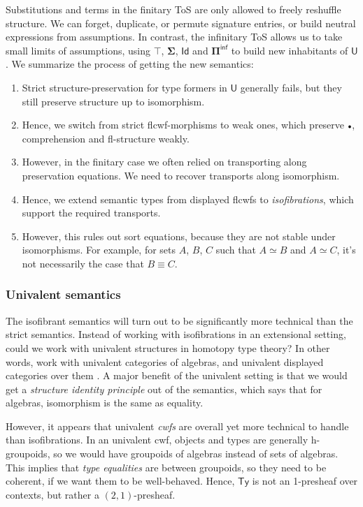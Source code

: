 \documentclass[12pt,a4paper,twoside,openany]{book}
\theoremstyle{remark}
\theoremstyle{definition}
\theoremstyle{theorem}
\newcommand{\bs}[1]{\boldsymbol{#1}}
\newcommand{\Ty}{\mathsf{Ty}}
\newcommand{\U}{\mathsf{U}}
\newcommand{\Id}{\mathsf{Id}}
\newcommand{\emptycon}{\scaleobj{.75}\bullet}
\newcommand{\Piinf}{\Pi^{\mathsf{inf}}}
\newcommand{\bU}{\bs{\U}}
\begin{document}
Substitutions and terms in the finitary ToS are only allowed to freely reshuffle
structure. We can forget, duplicate, or permute signature entries, or build
neutral expressions from assumptions. In contrast, the infinitary ToS allows us
to take small limits of assumptions, using $\bs{\top}$, $\bs{\Sigma}$, $\bs{\Id}$ and $\bs{\Piinf}$
to build new inhabitants of $\bU$. We summarize the process of getting the new
semantics:
\begin{enumerate}
\item Strict structure-preservation for type formers in $\bU$ generally fails, but they still
      preserve structure up to isomorphism.
\item Hence, we switch from strict flcwf-morphisms to weak ones, which preserve $\emptycon$, comprehension
      and fl-structure weakly.
\item However, in the finitary case we often relied on transporting along
      preservation equations. We need to recover transports along isomorphism.
\item Hence, we extend semantic types from displayed flcwfs to \emph{isofibrations}, which
      support the required transports.
\item However, this rules out sort equations, because they are not stable under
      isomorphisms. For example, for sets $A$, $B$, $C$ such that $A \simeq B$ and
      $A \simeq C$, it's not necessarily the case that $B \equiv C$.
\end{enumerate}

\subsubsection{Univalent semantics}

The isofibrant semantics will turn out to be significantly more technical than
the strict semantics. Instead of working with isofibrations in an extensional
setting, could we work with univalent structures in homotopy type theory? In
other words, work with univalent categories of algebras, and univalent displayed
categories over them \cite{displayedcats}. A major benefit of the univalent
setting is that we would get a \emph{structure identity principle} \cite{TODO}
out of the semantics, which says that for algebras, isomorphism is the same as
equality.

However, it appears that univalent \emph{cwfs} are overall yet more technical to
handle than isofibrations. In an univalent cwf, objects and types are generally
h-groupoids, so we would have groupoids of algebras instead of sets of
algebras. This implies that \emph{type equalities} are between groupoids, so
they need to be coherent, if we want them to be well-behaved. Hence, $\Ty$ is
not an 1-presheaf over contexts, but rather a $(2,1)$-presheaf.
\end{document}
